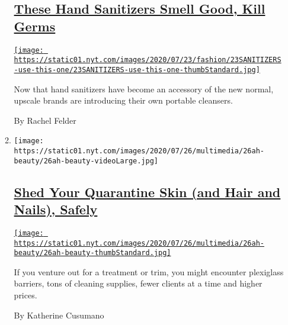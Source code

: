 \begin{enumerate}
\begin{enumerate}
    \hypertarget{these-hand-sanitizers-smell-good-kill-germs}{%
    \subsection{\texorpdfstring{\href{/2020/07/22/style/these-hand-sanitizers-smell-good-kill-germs.html}{These
    Hand Sanitizers Smell Good, Kill
    Germs}}{These Hand Sanitizers Smell Good, Kill Germs}}\label{these-hand-sanitizers-smell-good-kill-germs}}

    \href{/2020/07/22/style/these-hand-sanitizers-smell-good-kill-germs.html}{\texttt{[image: https://static01.nyt.com/images/2020/07/23/fashion/23SANITIZERS-use-this-one/23SANITIZERS-use-this-one-thumbStandard.jpg]}}

    Now that hand sanitizers have become an accessory of the new normal,
    upscale brands are introducing their own portable cleansers.

    By Rachel Felder
  \item
    \texttt{[image: https://static01.nyt.com/images/2020/07/26/multimedia/26ah-beauty/26ah-beauty-videoLarge.jpg]}

    \hypertarget{shed-your-quarantine-skin-and-hair-and-nails-safely}{%
    \subsection{\texorpdfstring{\href{/2020/07/25/at-home/coronavirus-salons.html}{Shed
    Your Quarantine Skin (and Hair and Nails),
    Safely}}{Shed Your Quarantine Skin (and Hair and Nails), Safely}}\label{shed-your-quarantine-skin-and-hair-and-nails-safely}}

    \href{/2020/07/25/at-home/coronavirus-salons.html}{\texttt{[image: https://static01.nyt.com/images/2020/07/26/multimedia/26ah-beauty/26ah-beauty-thumbStandard.jpg]}}

    If you venture out for a treatment or trim, you might encounter
    plexiglass barriers, tons of cleaning supplies, fewer clients at a
    time and higher prices.

    By Katherine Cusumano
  \end{enumerate}
\end{enumerate}


